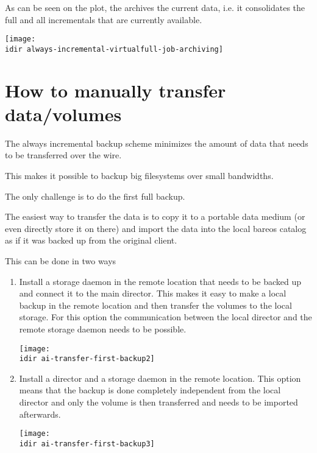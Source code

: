 As can be seen on the plot, the  archives the current data,
i.e. it consolidates the full and all incrementals that are currently available.

\begin{center}
\texttt{[image: \\idir always-incremental-virtualfull-job-archiving]}
\end{center}


\chapter{How to manually transfer data/volumes}

The always incremental backup scheme minimizes the amount of data that needs 
to be transferred over the wire.

This makes it possible to backup big filesystems over small bandwidths.

The only challenge is to do the first full backup.


The easiest way to transfer the data is to copy it to a portable 
data medium (or even directly store it on there) and import the 
data into the local bareos catalog as if it was backed up from the 
original client.


This can be done in two ways

\begin{enumerate}
    \item Install a storage daemon in the remote location that needs to be backed up and connect it to the main director.
   This makes it easy to make a local backup in the remote location and then transfer the volumes to the local storage.
   For this option the communication between the local director and the remote storage daemon needs to be possible.
\begin{center}
\texttt{[image: \\idir ai-transfer-first-backup2]}
\end{center}

    \item Install a director and a storage daemon in the remote location.
   This option means that the backup is done completely independent from the local director and only the volume is then transferred and needs to be imported afterwards. 
\begin{center}
\texttt{[image: \\idir ai-transfer-first-backup3]}
\end{center}

\end{enumerate}



